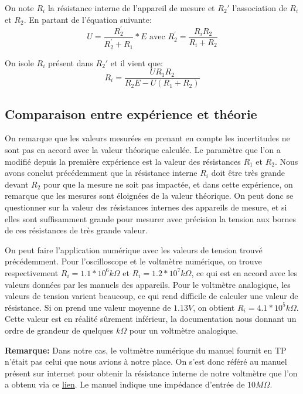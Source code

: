 \documentclass[10pt]{article}
\begin{document}
On note $R_i$ la résistance interne de l'appareil de mesure et $R_2'$ l'association de $R_i$ et $R_2$. En partant de l'équation suivante:
\begin{equation}
    U = \frac{R_2^{'}}{R_2^{'} + R_1} * E \text{ avec } R_2^{'} = \frac{R_iR_2}{R_i + R_2}
\end{equation}

On isole $R_i$ présent dans $R_2'$ et il vient que:
\begin{equation}
    R_i = \frac{U R_1 R_2}{R_2 E - U (R_1 + R_2)}
\end{equation}

\subsection{Comparaison entre expérience et théorie}


	On remarque que les valeurs mesurées en prenant en compte les incertitudes ne sont pas en accord avec la valeur théorique calculée.
Le paramètre que l'on a modifié depuis la première expérience est la valeur des résistances $R_1$ et $R_2$. 
Nous avons conclut précédemment que la résistance interne $R_i$ doit être très grande devant $R_2$ pour que la mesure ne soit pas impactée,
et dans cette expérience, on remarque que les mesures sont éloignées de la valeur théorique. 
On peut donc se questionner sur la valeur des résistances internes des appareils de mesure, et si elles sont suffisamment grande
pour mesurer avec précision la tension aux bornes de ces résistances de très grande valeur.


On peut faire l'application numérique avec les valeurs de tension trouvé précédemment. Pour l'oscilloscope et le voltmètre numérique, on trouve respectivement $R_i = 1.1*10^{6} k\Omega$ 
et $R_i = 1.2*10^{7} k\Omega$, ce qui est en accord avec les valeurs données par les manuels des appareils. Pour le voltmètre analogique, les valeurs de tension varient beaucoup, 
ce qui rend difficile de calculer une valeur de résistance. Si on prend une valeur moyenne de $1.13V$, on obtient $R_i= 4.1*10^{5} k\Omega$. 
Cette valeur est en réalité sûrement inférieur, la documentation nous donnant un ordre de grandeur de quelques $k\Omega$ pour un voltmètre analogique. 

\textbf{Remarque: } Dans notre cas, le voltmètre numérique du manuel fournit en TP n'était pas celui que nous avions à notre place. On s'est donc référé au manuel présent sur internet pour obtenir la résistance interne 
de notre voltmètre que l'on a obtenu via ce \href{https://cdn.rohde-schwarz.com/hameg-archive/HM8011-3.pdf}{lien}. Le manuel indique une impédance d'entrée de $10 M \Omega$.
\end{document}
